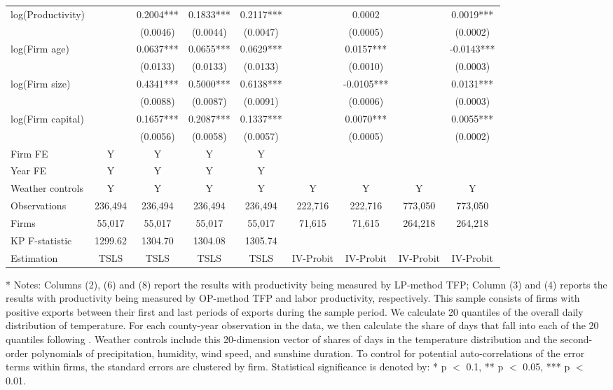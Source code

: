 \documentclass[12pt]{article}
\begin{document}
\begin{table}[H]
{\begin{tabular}{l*{8}{c}}
          log(Productivity)    &             &0.2004***&0.1833***  & 0.2117***    &        &0.0002&   &0.0019***\\
                               &             &(0.0046)&(0.0044)   &  (0.0047)     &        &(0.0005)&&(0.0002)\\
          log(Firm age)        &             &0.0637***&0.0655***  & 0.0629***    &        &0.0157***&&-0.0143***\\
                               &              &(0.0133)&(0.0133)   & (0.0133)     &        &(0.0010)&&(0.0003)\\
          log(Firm size)       &             &0.4341***&0.5000***  & 0.6138***    &        &-0.0105***&&0.0131***\\
                               &              &(0.0088)&(0.0087)   &  (0.0091)    &        &(0.0006)&&(0.0003)\\
          log(Firm capital)    &             &0.1657***&0.2087***  & 0.1337***    &        &0.0070***&&0.0055***\\
                               &              &(0.0056)&(0.0058)   & (0.0057)     &        &(0.0005)&&(0.0002)\\
          \hline
          Firm FE          &Y&Y&Y&Y&&&&\\
          Year FE          &Y&Y&Y&Y&&&&\\
          Weather controls &Y&Y&Y&Y&Y&Y&Y&Y\\
          \hline
          Observations   &236,494&236,494&236,494&236,494 &222,716&222,716&773,050&773,050\\
          Firms          &55,017 &55,017&55,017 &55,017  & 71,615&71,615&264,218&264,218\\
          KP F-statistic &1299.62&1304.70&1304.08&1305.74&&&&\\
          Estimation &TSLS&TSLS&TSLS&TSLS&IV-Probit&IV-Probit&IV-Probit&IV-Probit\\
          \hline\hline
        \end{tabular}
        }
        \begin{tablenotes}
          \item[*] \small Notes: Columns (2), (6) and (8) report the results with productivity being measured by LP-method TFP; Column (3) and (4) reports the results with productivity being measured by OP-method TFP and labor productivity, respectively. This sample consists of firms with positive exports between their first and last periods of exports during the sample period. We calculate 20 quantiles of the overall daily distribution of temperature. For each county-year observation in the data, we then calculate the share of days that fall into each of the 20 quantiles following \citep{deschenes2017defensive}. Weather controls include this 20-dimension vector of shares of days in the temperature distribution and the second-order polynomials of precipitation, humidity, wind speed, and sunshine duration. To control for potential auto-correlations of the error terms within firms, the standard errors are clustered by firm. Statistical significance is denoted by: * p $<$ 0.1, ** p $<$ 0.05, *** p $<$ 0.01. 
        \end{tablenotes}
      \end{table}
\end{document}
